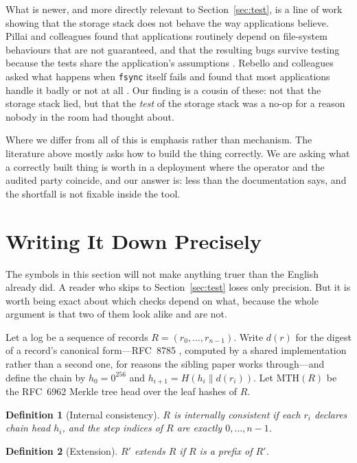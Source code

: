 \documentclass[11pt]{article}
\newtheorem{definition}{Definition}
\begin{document}
What is newer, and more directly relevant to Section~\ref{sec:test}, is a line
of work showing that the storage stack does not behave the way applications
believe. Pillai and colleagues found that applications routinely depend on
file-system behaviours that are not guaranteed, and that the resulting bugs
survive testing because the tests share the application's assumptions
\cite{pillai2014}. Rebello and colleagues asked what happens when
\texttt{fsync} itself fails and found that most applications handle it badly
or not at all \cite{rebello2020}. Our finding is a cousin of these: not that
the storage stack lied, but that the \emph{test} of the storage stack was a
no-op for a reason nobody in the room had thought about.

Where we differ from all of this is emphasis rather than mechanism. The
literature above mostly asks how to build the thing correctly. We are asking
what a correctly built thing is worth in a deployment where the operator and
the audited party coincide, and our answer is: less than the documentation
says, and the shortfall is not fixable inside the tool.

\section{Writing It Down Precisely}
\label{sec:formal}

The symbols in this section will not make anything truer than the English
already did. A reader who skips to Section~\ref{sec:test} loses only precision.
But it is worth being exact about which checks depend on what, because the
whole argument is that two of them look alike and are not.

Let a log be a sequence of records $R = (r_0, \dots, r_{n-1})$. Write $d(r)$
for the digest of a record's canonical form---RFC~8785 \cite{rfc8785}, computed
by a shared implementation rather than a second one, for reasons the sibling
paper works through---and define the chain by
$h_0 = 0^{256}$ and $h_{i+1} = H(h_i \| d(r_i))$. Let $\mathrm{MTH}(R)$ be the
RFC~6962 Merkle tree head over the leaf hashes of $R$.

\begin{definition}[Internal consistency]
$R$ is internally consistent if each $r_i$ declares chain head $h_i$, and the
step indices of $R$ are exactly $0, \dots, n-1$.
\end{definition}

\begin{definition}[Extension]
$R'$ extends $R$ if $R$ is a prefix of $R'$.
\end{definition}
\end{document}
